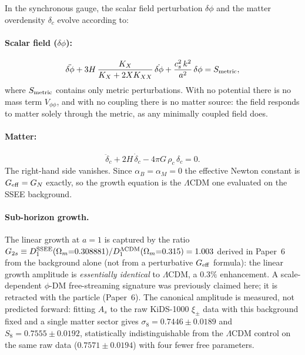 \documentclass[12pt,a4paper]{article}
\newcommand{\Omm}{\Omega_{m}}
\begin{document}
In the synchronous gauge, the scalar field perturbation $\delta\phi$ and
the matter overdensity $\delta_{c}$ evolve according to:

\paragraph{Scalar field ($\delta\phi$):}
\begin{equation}
  \ddot{\delta\phi}
  + 3H\,\frac{K_X}{K_X+2XK_{XX}}\,\dot{\delta\phi}
  + \frac{c_s^2\,k^2}{a^2}\,\delta\phi
  = S_{\rm metric},
  \label{eq:pert_phi}
\end{equation}
where $S_{\rm metric}$ contains only metric perturbations.  With no
potential there is no mass term $V_{\phi\phi}$, and with no coupling
there is no matter source: the field responds to matter solely through
the metric, as any minimally coupled field does.

\paragraph{Matter:}
\begin{equation}
  \ddot\delta_{c} + 2H\,\dot\delta_{c}
  - 4\pi G\,\rho_{c}\,\delta_{c} = 0.
  \label{eq:pert_DM}
\end{equation}
The right-hand side vanishes.  Since $\alpha_B = \alpha_M = 0$ the
effective Newton constant is $G_{\rm eff} = G_N$ exactly, so the growth
equation is the $\Lambda$CDM one evaluated on the SSEE background.

\paragraph{Sub-horizon growth.}
The linear growth at $a=1$ is captured by the ratio
$G_{2s} \equiv D_1^{\rm SSEE}(\Omm{=}0.308881) /
D_1^{\Lambda\rm CDM}(\Omm{=}0.315) = 1.003$
derived in Paper~6 from the background alone (not from a perturbative
$G_{\rm eff}$ formula): the linear growth amplitude is
\emph{essentially identical} to $\Lambda$CDM, a $0.3\%$ enhancement.
A scale-dependent $\phi$-DM free-streaming signature was previously
claimed here; it is retracted with the particle (Paper~6).  The canonical
amplitude is measured, not predicted forward: fitting $A_s$ to the raw
KiDS-1000 $\xi_\pm$ data with this background fixed and a single matter
sector gives $\sigma_8=0.7446\pm0.0189$ and $S_8=0.7555\pm0.0192$,
statistically indistinguishable from the $\Lambda$CDM control on the same
raw data ($0.7571\pm0.0194$) with four fewer free parameters.
\end{document}
